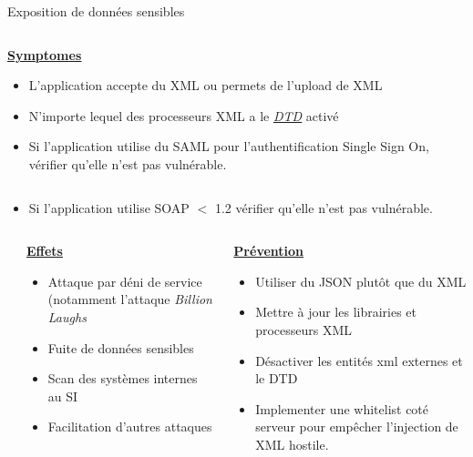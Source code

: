 \documentclass[final,hyperref={pdfpagelabels=false}]{beamer}
\begin{document}
\begin{frame}[t]
\begin{columns}[t]
\begin{column}{.465\textwidth}
\begin{block}{Exposition de données sensibles}
\begin{columns}[T]
		\begin{column}{.88\textwidth}
			\uline{\uline{\textbf{Symptomes}}}
			\begin{itemize}
				\item L'application accepte du XML ou permets de l'upload de XML
                \item N'importe lequel des processeurs XML a le
                    \href{https://www.w3schools.com/xml/xml_dtd_intro.asp}{\uline{\textit{DTD}}}
                    activé
				\item Si l'application utilise du SAML pour l'authentification
                    Single Sign On, vérifier qu'elle n'est pas vulnérable.
			\end{itemize}
		\end{column}
	\end{columns}
    \begin{itemize}
        \item Si l'application utilise SOAP $<$ 1.2 vérifier qu'elle n'est
            pas vulnérable.
    \end{itemize}
	\begin{columns}[T]
		\begin{column}{.01\textwidth}
		\end{column}
		\begin{column}{0.495\textwidth}
			\vfill
			\uline{\textbf{Effets}}
			\begin{itemize}
                \item Attaque par déni de service (notamment l'attaque \textit{Billion
                    Laughs}
				\item Fuite de données sensibles
                \item Scan des systèmes internes au SI
                \item Facilitation d'autres attaques
			\end{itemize}
			\vfill
		\end{column}
		\begin{column}{0.495\textwidth}
			\vfill
			\uline{\textbf{Prévention}}
			\begin{itemize}
				\item Utiliser du JSON plutôt que du XML
                \item Mettre à jour les librairies et processeurs XML
                \item Désactiver les entités xml externes et le DTD
                \item Implementer une whitelist coté serveur pour empêcher
                    l'injection de XML hostile.
			\end{itemize}
		\end{column}
	\end{columns}
\end{block}


\end{column}
\end{columns}
\end{frame}
\end{document}
